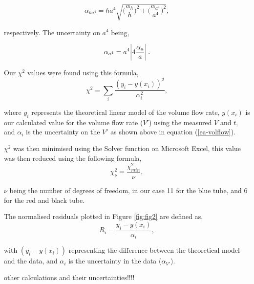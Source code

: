 \documentclass[twocolumn]{revtex4}
\begin{document}
\begin{equation} 
\alpha_{ha^4} = ha^4 \sqrt{ \Bigg( \frac{\alpha_{h}}{h} \Bigg)^2 + \Bigg( \frac{\alpha_{a^4}}{a^4} \Bigg)^2 }, 
\label{ea-hafour}
\end{equation}

respectively. The uncertainty on $a^4$ being, 

\begin{equation} 
\alpha_{a^4} = a^4 \abs{4 \frac{\alpha_a}{a}}.
\label{ea-tube}
\end{equation}

Our $\chi^2$ values were found using this formula, 
\begin{equation} 
\chi^2 = \sum_i \frac{(y_i - y(x_i))^2}{\alpha_i^2},
\label{ea-chisquared}
\end{equation}

where $y_i$ represents the theoretical linear model of the volume flow rate, $y(x_i)$ is our calculated value for the volume flow rate ($V'$) using the measured $V$ and $t$, and $\alpha_i$ is the uncertainty on the $V'$ as shown above in equation (\ref{ea-volflow}).

$\chi^2$ was then minimised using the Solver function on Microsoft Excel, this value was then reduced using the following formula,
\begin{equation} 
\chi^2_{\nu} = \frac{\chi^2_{min}}{\nu},
\label{ea-redchisquared}
\end{equation}

$\nu$ being the number of degrees of freedom, in our case 11 for the blue tube, and 6 for the red and black tube.

The normalised residuals plotted in Figure \ref{fig:fig2} are defined as,
\begin{equation} 
R_i = \frac{y_i - y(x_i)}{\alpha_i},
\label{ea-normalisedresid}
\end{equation}

with $(y_i - y(x_i))$ representing the difference between the theoretical model and the data, and $\alpha_i$ is the uncertainty in the data ($\alpha_{V'}$).

other calculations and their uncertainties!!!!

\clearpage
\end{document}
